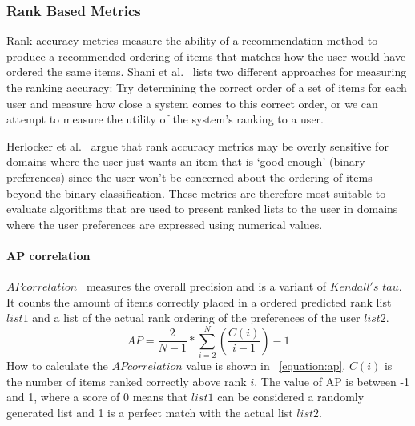 
\subsubsection{Rank Based Metrics}
\label{para:rank_based}
Rank accuracy metrics measure the ability of a recommendation method to produce
a recommended ordering of items that matches how the user would have ordered
the same items. Shani et al.~\cite{Shani2011} lists two different approaches
for measuring the ranking accuracy: Try determining the correct order of a set
of items for each user and measure how close a system comes to this correct
order, or we can attempt to measure the utility of the system's ranking to a
user.

Herlocker et al.~\cite{Herlocker2004} argue that rank accuracy metrics may be
overly sensitive for domains where the user just wants an item that is `good
enough' (binary preferences) since the user won't be concerned about the
ordering of items beyond the binary classification. These metrics are therefore
most suitable to evaluate algorithms that are used to present ranked lists to
the user in domains where the user preferences are expressed using numerical
values.

\paragraph{AP correlation}
\label{subp:ap_correlation}
$AP correlation$~\cite{Yilmaz:2008:NRC:1390334.1390435} measures the overall precision and is a variant of $Kendall's$ $tau$.
It counts the amount of items correctly placed in a ordered predicted rank list $list1$ and a list of the actual rank ordering of the preferences of the user $list2$.
\begin{equation}
	AP = \frac{2}{N - 1} * \sum_{i=2}^{N}{(\frac{C(i)}{i - 1})} - 1
	\label{equation:ap}
\end{equation}
How to calculate the $AP correlation$ value is shown in ~\ref{equation:ap}.
$C(i)$ is the number of items ranked correctly above rank $i$.
The value of AP is between -1 and 1, where a score of 0 means that $list1$ can be considered a randomly generated list and 1 is a perfect match with the actual list $list2$.

